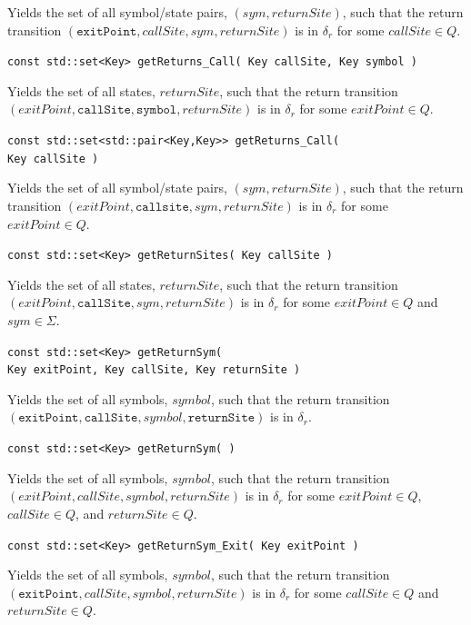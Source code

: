 \documentclass{llncs}
\begin{document}
\begin{description}
    Yields the set of all symbol/state pairs, $(sym,returnSite)$, such that the return transition $(\texttt{exitPoint},callSite,sym,returnSite)$ is in $\delta_r$ for some $callSite \in Q$.

  \item\texttt{const std::set<Key> getReturns\_Call( Key callSite, Key symbol )} \nopagebreak

    Yields the set of all states, $returnSite$, such that the return transition $(exitPoint,\texttt{callSite},\texttt{symbol},returnSite)$ is in $\delta_r$ for some $exitPoint \in Q$.

  \item\texttt{const std::set<std::pair<Key,Key>> getReturns\_Call( \\ \hspace*{3.25cm} Key callSite )} \nopagebreak

    Yields the set of all symbol/state pairs, $(sym,returnSite)$, such that the return transition $(exitPoint,\texttt{callsite},sym,returnSite)$ is in $\delta_r$ for some $exitPoint \in Q$.

  \item\texttt{const std::set<Key> getReturnSites( Key callSite )} \nopagebreak

    Yields the set of all states, $returnSite$, such that the return transition $(exitPoint,\texttt{callSite},sym,returnSite)$ is in $\delta_r$ for some $exitPoint \in Q$ and $sym \in \Sigma$.

  \item\texttt{const std::set<Key> getReturnSym( \\ \hspace*{3.25cm}Key exitPoint, Key callSite, Key returnSite )} \nopagebreak

    Yields the set of all symbols, $symbol$, such that the return transition $(\texttt{exitPoint},\texttt{callSite},symbol,\texttt{returnSite})$ is in $\delta_r$.

  \item\texttt{const std::set<Key> getReturnSym( )} \nopagebreak

    Yields the set of all symbols, $symbol$, such that the return transition $(exitPoint,callSite,symbol,returnSite)$ is in $\delta_r$ for some $exitPoint \in Q$, $callSite \in Q$, and $returnSite \in Q$.

  \item\texttt{const std::set<Key> getReturnSym\_Exit( Key exitPoint )} \nopagebreak

    Yields the set of all symbols, $symbol$, such that the return transition $(\texttt{exitPoint},callSite,symbol,returnSite)$  is in $\delta_r$ for some $callSite \in Q$ and $returnSite \in Q$.


\end{description}
\end{document}
